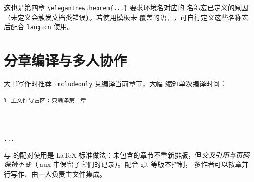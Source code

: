 这也是第四章 \verb|\elegantnewtheorem{...}| 要求环境名对应的
名称宏已定义的原因（未定义会触发文档类错误）。若使用模板未
覆盖的语言，可自行定义这些名称宏后配合 \texttt{lang=cn}
使用。

\section{分章编译与多人协作}

大书写作时推荐 \texttt{includeonly} 只编译当前章节，大幅
缩短单次编译时间：

\begin{lstlisting}
% 主文件导言区：只编译第二章



...
\end{lstlisting}

\verb|| 与 \verb|| 的配对使用是 LaTeX
标准做法：未包含的章节不重新排版，但\emph{交叉引用与页码
保持不变}（.aux 中保留了它们的记录）。配合 git 等版本控制，
多作者可以按章并行写作、由一人负责主文件集成。
